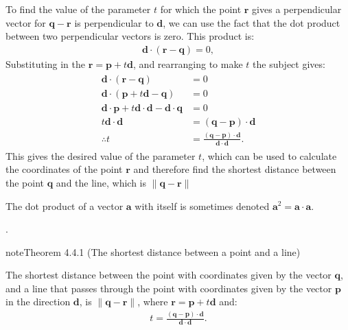 \documentclass[letterpaper,10pt,english]{jupyterBook}
\begin{document}
\sphinxAtStartPar
To find the value of the parameter \(t\) for which the point \(\mathbf{r}\) gives a perpendicular vector for \(\mathbf{q} - \mathbf{r}\) is perpendicular to \(\mathbf{d}\), we can use the fact that the dot product between two perpendicular vectors is zero. This product is:
\begin{equation*}
\begin{split} \mathbf{d} \cdot (\mathbf{r} - \mathbf{q}) = 0, \end{split}
\end{equation*}
\sphinxAtStartPar
Substituting in the {\hyperref[\detokenize{_pages/4.1_Lines:vector-equation-of-a-line-definition}]{}} \(\mathbf{r} = \mathbf{p} + t\mathbf{d}\), and rearranging to make \(t\) the subject gives:
\begin{equation*}
\begin{split} \begin{align*}
    \mathbf{d} \cdot (\mathbf{r} - \mathbf{q}) &= 0 \\
    \mathbf{d} \cdot (\mathbf{p} + t \mathbf{d} - \mathbf{q}) &= 0 \\
    \mathbf{d} \cdot \mathbf{p} + t \mathbf{d} \cdot \mathbf{d} - \mathbf{d} \cdot \mathbf{q} &= 0 \\
    t \mathbf{d} \cdot \mathbf{d} &= (\mathbf{q} - \mathbf{p}) \cdot \mathbf{d} \\
    \therefore t &= \frac{(\mathbf{q} - \mathbf{p}) \cdot \mathbf{d}}{\mathbf{d} \cdot \mathbf{d}}.
\end{align*} \end{split}
\end{equation*}
\sphinxAtStartPar
This gives the desired value of the parameter \(t\), which can be used to calculate the coordinates of the point \(\mathbf{r}\) and therefore find the shortest distance between the point \(\mathbf{q}\) and the line, which is \(\|\mathbf{q} - \mathbf{r}\|\)%
\begin{footnote}[1]\sphinxAtStartFootnote
The dot product of a vector \(\mathbf{a}\) with itself is sometimes denoted \(\mathbf{a}^2 = \mathbf{a} \cdot \mathbf{a}\).
%
\end{footnote}.
\label{_pages/4.3_Shortest_distance_problems:point-line-distance-theorem}
\begin{sphinxadmonition}{note}{Theorem 4.4.1 (The shortest distance between a point and a line)}



\sphinxAtStartPar
The shortest distance between the point with coordinates given by the vector \(\mathbf{q}\), and a line that passes through the point with coordinates given by the vector \(\mathbf{p}\) in the direction \(\mathbf{d}\), is \(\|\mathbf{q} - \mathbf{r}\|\), where \(\mathbf{r} = \mathbf{p} + t \mathbf{d}\) and:
\begin{equation}\label{equation:_pages/4.3_Shortest_distance_problems:point-line-t-equation}
\begin{split} t = \frac{(\mathbf{q} - \mathbf{p}) \cdot \mathbf{d}}{\mathbf{d} \cdot \mathbf{d}}. \end{split}
\end{equation}\end{sphinxadmonition}
\end{document}
